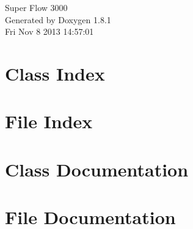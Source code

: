 \documentclass{book}
\begin{document}
\hypersetup{pageanchor=false,citecolor=blue}
\begin{titlepage}
\vspace*{7cm}
\begin{center}
{\Large Super Flow 3000 }\\
\vspace*{1cm}
{\large Generated by Doxygen 1.8.1}\\
\vspace*{0.5cm}
{\small Fri Nov 8 2013 14:57:01}\\
\end{center}
\end{titlepage}
\clearemptydoublepage
{}
\tableofcontents
\clearemptydoublepage
{}
\hypersetup{pageanchor=true,citecolor=blue}
\chapter{Class Index}

\chapter{File Index}

\chapter{Class Documentation}






\chapter{File Documentation}



















\printindex
\end{document}
